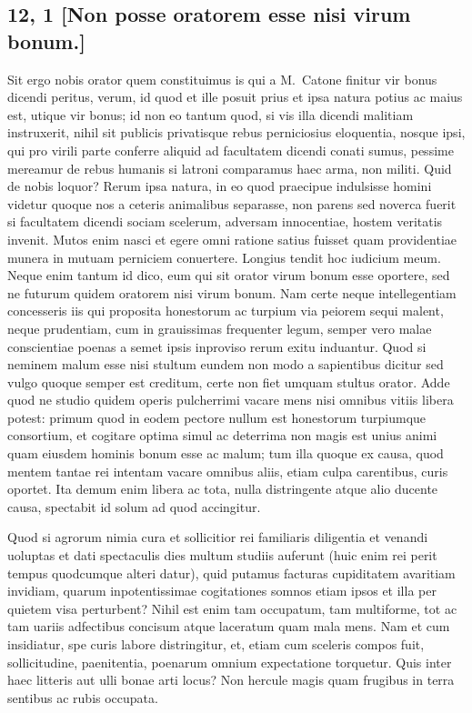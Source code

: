 \subsection*{12, 1 [Non posse oratorem esse nisi virum bonum.]}
 

Sit ergo nobis orator quem constituimus is qui a M.~Catone finitur vir bonus dicendi peritus, verum, id quod et ille posuit prius et ipsa natura potius ac maius est, utique vir bonus; id non eo tantum quod, si vis illa dicendi malitiam instruxerit, nihil sit publicis privatisque rebus perniciosius eloquentia, nosque ipsi, qui pro virili parte conferre aliquid ad facultatem dicendi conati sumus, pessime mereamur de rebus humanis si latroni comparamus haec arma, non militi. Quid de nobis loquor? Rerum ipsa natura, in eo quod praecipue indulsisse homini videtur quoque nos a ceteris animalibus separasse, non parens sed noverca fuerit si facultatem dicendi sociam scelerum, adversam innocentiae, hostem veritatis invenit. Mutos enim nasci et egere omni ratione satius fuisset quam providentiae munera in mutuam perniciem conuertere. Longius tendit hoc iudicium meum. Neque enim tantum id dico, eum qui sit orator virum bonum esse oportere, sed ne futurum quidem oratorem nisi virum bonum. Nam certe neque intellegentiam concesseris iis qui proposita honestorum ac turpium via peiorem sequi malent, neque prudentiam, cum in grauissimas frequenter legum, semper vero malae conscientiae poenas a semet ipsis inproviso rerum exitu induantur. Quod si neminem malum esse nisi stultum eundem non modo a sapientibus dicitur sed vulgo quoque semper est creditum, certe non fiet umquam stultus orator. Adde quod ne studio quidem operis pulcherrimi vacare mens nisi omnibus vitiis libera potest: primum quod in eodem pectore nullum est honestorum turpiumque consortium, et cogitare optima simul ac deterrima non magis est unius animi quam eiusdem hominis bonum esse ac malum; tum illa quoque ex causa, quod mentem tantae rei intentam vacare omnibus aliis, etiam culpa carentibus, curis oportet. Ita demum enim libera ac tota, nulla distringente atque alio ducente causa, spectabit id solum ad quod accingitur. 

Quod si agrorum nimia cura et sollicitior rei familiaris diligentia et venandi uoluptas et dati spectaculis dies multum studiis auferunt (huic enim rei perit tempus quodcumque alteri datur), quid putamus facturas cupiditatem avaritiam invidiam, quarum inpotentissimae cogitationes somnos etiam ipsos et illa per quietem visa perturbent? Nihil est enim tam occupatum, tam multiforme, tot ac tam uariis adfectibus concisum atque laceratum quam mala mens. Nam et cum insidiatur, spe curis labore distringitur, et, etiam cum sceleris compos fuit, sollicitudine, paenitentia, poenarum omnium expectatione torquetur. Quis inter haec litteris aut ulli bonae arti locus? Non hercule magis quam frugibus in terra sentibus ac rubis occupata. 


